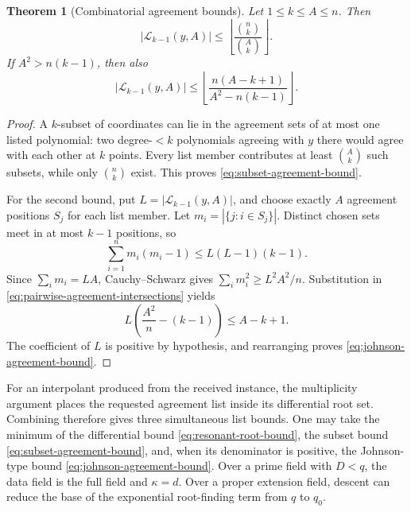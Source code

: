 \documentclass[11pt,letterpaper]{article}
\newtheorem{theorem}{Theorem}[section]
\theoremstyle{definition}
\newcommand{\List}{\mathcal{L}}
\begin{document}
\begin{theorem}[Combinatorial agreement bounds]
\label{thm:agreement-upper-bounds}
Let \(1\leq k\leq A\leq n\). Then
\begin{equation}
  |\List_{k-1}(y,A)|
  \leq
  \left\lfloor\frac{\binom nk}{\binom Ak}\right\rfloor.
  \label{eq:subset-agreement-bound}
\end{equation}
If \(A^2>n(k-1)\), then also
\begin{equation}
  |\List_{k-1}(y,A)|
  \leq
  \left\lfloor
    \frac{n(A-k+1)}{A^2-n(k-1)}
  \right\rfloor.
  \label{eq:johnson-agreement-bound}
\end{equation}
\end{theorem}

\begin{proof}
A \(k\)-subset of coordinates can lie in the agreement sets of at most one
listed polynomial: two degree-\(<k\) polynomials agreeing with \(y\) there
would agree with each other at \(k\) points. Every list member contributes
at least \(\binom Ak\) such subsets, while only \(\binom nk\) exist. This
proves \eqref{eq:subset-agreement-bound}.

For the second bound, put \(L=|\List_{k-1}(y,A)|\), and choose exactly \(A\)
agreement positions \(S_j\) for each list member. Let
\(m_i=|\{j:i\in S_j\}|\). Distinct chosen sets meet in at most \(k-1\)
positions, so
\begin{equation}
  \sum_{i=1}^n m_i(m_i-1)
  \leq L(L-1)(k-1).
  \label{eq:pairwise-agreement-intersections}
\end{equation}
Since \(\sum_i m_i=LA\), Cauchy--Schwarz gives
\(\sum_i m_i^2\geq L^2A^2/n\). Substitution in
\eqref{eq:pairwise-agreement-intersections} yields
\[
  L\left(\frac{A^2}{n}-(k-1)\right)\leq A-k+1.
\]
The coefficient of \(L\) is positive by hypothesis, and rearranging proves
\eqref{eq:johnson-agreement-bound}.
\end{proof}

For an interpolant produced from the received instance, the multiplicity
argument places the requested agreement list inside its differential root
set.  Combining
therefore gives three simultaneous list bounds.  One may take the minimum of the differential
bound \eqref{eq:resonant-root-bound}, the subset bound
\eqref{eq:subset-agreement-bound}, and, when its denominator is positive,
the Johnson-type bound \eqref{eq:johnson-agreement-bound}.  Over a prime
field with \(D<q\), the data field is the full field and
\(\kappa=d\).  Over a proper extension field, descent can reduce the base
of the exponential root-finding term from \(q\) to \(q_0\).
\end{document}
